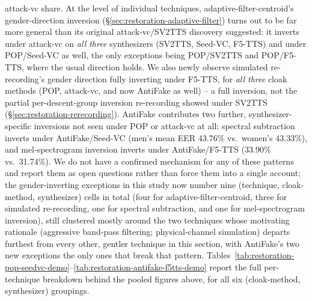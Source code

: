 \documentclass[11pt]{article}
\begin{document}
attack-vc share. At the level of individual techniques,
adaptive-filter-centroid's gender-direction inversion
(\S\ref{sec:restoration-adaptive-filter}) turns out to be far more
general than its original attack-vc/SV2TTS discovery suggested: it
inverts under attack-vc on \emph{all three} synthesizers (SV2TTS,
Seed-VC, F5-TTS) and under POP/Seed-VC as well, the only exceptions
being POP/SV2TTS and POP/F5-TTS, where the usual direction holds. We
also newly observe simulated re-recording's gender direction fully
inverting under F5-TTS, for \emph{all three} cloak methods (POP,
attack-vc, and now AntiFake as well) -- a full inversion, not the
partial per-descent-group inversion re-recording showed under SV2TTS
(\S\ref{sec:restoration-rerecording}). AntiFake contributes two further,
synthesizer-specific inversions not seen under POP or attack-vc at all:
spectral subtraction inverts under AntiFake/Seed-VC (men's mean EER
43.76\% vs.\ women's 43.33\%), and mel-spectrogram inversion inverts
under AntiFake/F5-TTS (33.90\% vs.\ 31.74\%). We do not have a
confirmed mechanism for any of these patterns and report them as open
questions rather than force them into a single account; the
gender-inverting exceptions in this study now number nine (technique,
cloak-method, synthesizer) cells in total (four for
adaptive-filter-centroid, three for simulated re-recording, one for
spectral subtraction, and one for mel-spectrogram inversion), still
clustered mostly around the two techniques whose motivating rationale
(aggressive band-pass filtering; physical-channel simulation) departs
furthest from every other, gentler technique in this section, with
AntiFake's two new exceptions the only ones that break that pattern.
Tables~\ref{tab:restoration-pop-seedvc-demo}--\ref{tab:restoration-antifake-f5tts-demo}
report the full per-technique breakdown behind the pooled figures
above, for all six (cloak-method, synthesizer) groupings.
\end{document}
